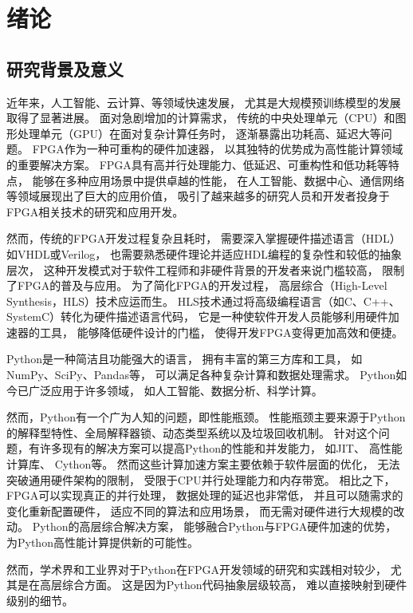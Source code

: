 \section{绪论}

\subsection{研究背景及意义}

近年来，人工智能、云计算、等领域快速发展，
尤其是大规模预训练模型的发展取得了显著进展。
面对急剧增加的计算需求，
传统的中央处理单元（CPU）和图形处理单元（GPU）在面对复杂计算任务时，
逐渐暴露出功耗高、延迟大等问题。
FPGA作为一种可重构的硬件加速器，
以其独特的优势成为高性能计算领域的重要解决方案。
FPGA具有高并行处理能力、低延迟、可重构性和低功耗等特点，
能够在多种应用场景中提供卓越的性能，
在人工智能\cite{zeng2024flightllm}、数据中心、通信网络等领域展现出了巨大的应用价值，
吸引了越来越多的研究人员和开发者投身于FPGA相关技术的研究和应用开发。

然而，传统的FPGA开发过程复杂且耗时，
需要深入掌握硬件描述语言（HDL）如VHDL或Verilog，
也需要熟悉硬件理论并适应HDL编程的复杂性和较低的抽象层次，
这种开发模式对于软件工程师和非硬件背景的开发者来说门槛较高，
限制了FPGA的普及与应用。
为了简化FPGA的开发过程，
高层综合（High-Level Synthesis，HLS）技术\cite{hls}应运而生。
HLS技术通过将高级编程语言（如C、C++、SystemC）转化为硬件描述语言代码，
它是一种使软件开发人员能够利用硬件加速器的工具，
能够降低硬件设计的门槛，
使得开发FPGA变得更加高效和便捷。

Python是一种简洁且功能强大的语言，
拥有丰富的第三方库和工具，
如NumPy、SciPy、Pandas等，
可以满足各种复杂计算和数据处理需求。
Python如今已广泛应用于许多领域，
如人工智能、数据分析、科学计算。

然而，Python有一个广为人知的问题，即性能瓶颈。
性能瓶颈主要来源于Python的解释型特性、全局解释器锁、动态类型系统以及垃圾回收机制。
针对这个问题，有许多现有的解决方案可以提高Python的性能和并发能力，
如JIT\cite{rpython}\cite{pypy1}\cite{izawa2022threaded}\cite{pypy2}、
高性能计算库\cite{harris2020array}、
Cython\cite{cython}等。
然而这些计算加速方案主要依赖于软件层面的优化，
无法突破通用硬件架构的限制，
受限于CPU并行处理能力和内存带宽。
相比之下，FPGA可以实现真正的并行处理，
数据处理的延迟也非常低，
并且可以随需求的变化重新配置硬件，
适应不同的算法和应用场景，
而无需对硬件进行大规模的改动。
Python的高层综合解决方案，
能够融合Python与FPGA硬件加速的优势，
为Python高性能计算提供新的可能性。

然而，学术界和工业界对于Python在FPGA开发领域的研究和实践相对较少，
尤其是在高层综合方面。
这是因为Python代码抽象层级较高，
难以直接映射到硬件级别的细节。

